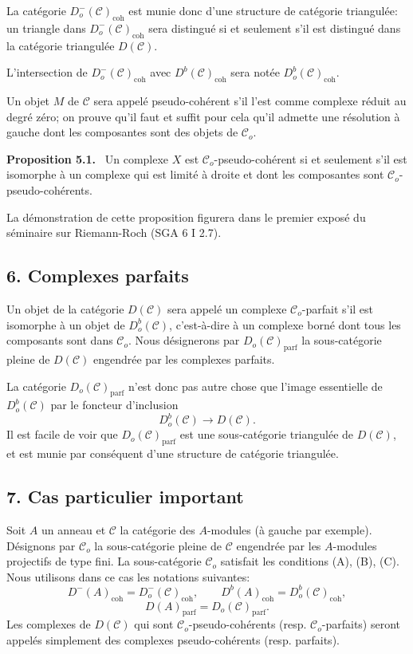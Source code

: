 \documentclass[11pt]{article}
\newenvironment{statement}[1]{\par\medskip\noindent\textbf{#1.}\ }{\par\medskip}
\providecommand{\parf}{\mathrm{parf}}
\providecommand{\coh}{\mathrm{coh}}
\providecommand{\cC}{\mathcal C}
\providecommand{\cC}{\mathcal C}
\providecommand{\parf}{\mathrm{parf}}
\providecommand{\coh}{\mathrm{coh}}
\begin{document}
La catégorie $D_o^-(\cC)_{\coh}$ est munie donc d'une structure de catégorie triangulée: un triangle dans $D_o^-(\cC)_{\coh}$ sera distingué si et seulement s'il est distingué dans la catégorie triangulée $D(\cC)$.

L'intersection de $D_o^-(\cC)_{\coh}$ avec $D^b(\cC)_{\coh}$ sera notée $D_o^b(\cC)_{\coh}$.

Un objet $M$ de $\cC$ sera appelé pseudo-cohérent s'il l'est comme complexe réduit au degré zéro; on prouve qu'il faut et suffit pour cela qu'il admette une résolution à gauche dont les composantes sont des objets de $\cC_o$.

\begin{statement}{Proposition 5.1}
Un complexe $X$ est $\cC_o$-pseudo-cohérent si et seulement s'il est isomorphe à un complexe qui est limité à droite et dont les composantes sont $\cC_o$-pseudo-cohérents.
\end{statement}

La démonstration de cette proposition figurera dans le premier exposé du séminaire sur Riemann-Roch (SGA 6 I 2.7).

\subsection*{6. Complexes parfaits}

Un objet de la catégorie $D(\cC)$ sera appelé un complexe $\cC_o$-parfait s'il est isomorphe à un objet de $D_o^b(\cC)$, c'est-à-dire à un complexe borné dont tous les composants sont dans $\cC_o$. Nous désignerons par $D_o(\cC)_{\parf}$ la sous-catégorie pleine de $D(\cC)$ engendrée par les complexes parfaits.

La catégorie $D_o(\cC)_{\parf}$ n'est donc pas autre chose que l'image essentielle de $D_o^b(\cC)$ par le foncteur d'inclusion
\[
D_o^b(\cC)\longrightarrow D(\cC).
\]
Il est facile de voir que $D_o(\cC)_{\parf}$ est une sous-catégorie triangulée de $D(\cC)$, et est munie par conséquent d'une structure de catégorie triangulée.

\subsection*{7. Cas particulier important}

Soit $A$ un anneau et $\cC$ la catégorie des $A$-modules (à gauche par exemple). Désignons par $\cC_o$ la sous-catégorie pleine de $\cC$ engendrée par les $A$-modules projectifs de type fini. La sous-catégorie $\cC_o$ satisfait les conditions (A), (B), (C). Nous utilisons dans ce cas les notations suivantes:
\[
D^-(A)_{\coh}=D_o^-(\cC)_{\coh},\qquad
D^b(A)_{\coh}=D_o^b(\cC)_{\coh},
\]
\[
D(A)_{\parf}=D_o(\cC)_{\parf}.
\]
Les complexes de $D(\cC)$ qui sont $\cC_o$-pseudo-cohérents (resp. $\cC_o$-parfaits) seront appelés simplement des complexes pseudo-cohérents (resp. parfaits).
\end{document}

